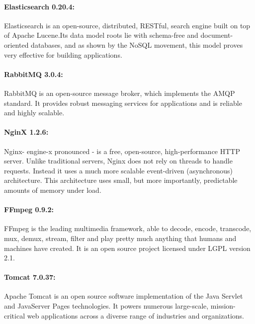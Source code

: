 \paragraph{Elasticsearch 0.20.4:} Elasticsearch is an open-source, distributed, RESTful, search engine built on top of Apache Lucene.Its data model roots lie with schema-free and document-oriented databases, and as shown by the NoSQL movement, this model proves very effective for building applications.

\paragraph{RabbitMQ 3.0.4:} RabbitMQ is an open-source message broker, which implements the AMQP standard. It provides  robust messaging services for applications and is reliable and highly scalable.

\paragraph{NginX 1.2.6:} Nginx- engine-x pronounced - is a free, open-source, high-performance \ac{HTTP} server. Unlike traditional servers, Nginx does not rely on threads to handle requests. Instead it uses a much more scalable event-driven (asynchronous) architecture. This architecture uses small, but more importantly, predictable amounts of memory under load.

\paragraph{FFmpeg 0.9.2:} FFmpeg is the leading multimedia framework, able to decode, encode, transcode, mux, demux, stream, filter and play pretty much anything that humans and machines have created. It is an open source project licensed under LGPL version 2.1.

\paragraph{Tomcat 7.0.37:} Apache Tomcat is an open source software implementation of the Java Servlet and JavaServer Pages technologies. It powers numerous large-scale, mission-critical web applications across a diverse range of industries and organizations.


